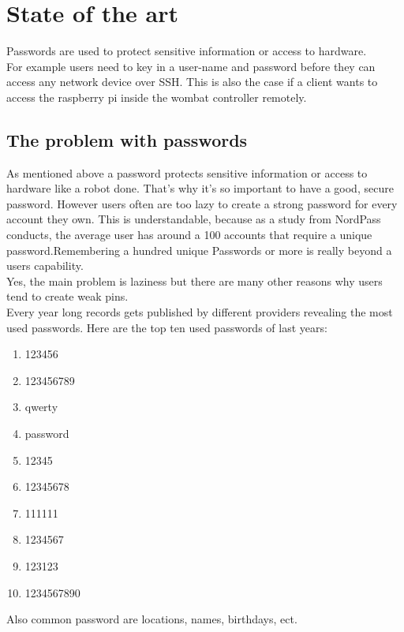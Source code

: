 \documentclass[conference]{IEEEtran}
\begin{document}
\section{State of the art}
Passwords are used to protect sensitive information or access to hardware.\\
 For example users need to key in a user-name and password before they can access any network device over SSH. This is also the case if a client wants to access the raspberry pi inside the wombat controller remotely. 

\subsection{The problem with passwords} \cite{b1} \cite{b2}
As mentioned above a password protects sensitive information or access to hardware like a robot done. That's why it's so important to have a good, secure password. However users often are too lazy to create a strong password for every account they own. This is understandable, because as a study from NordPass conducts, the average user has around a 100 accounts that require a unique password.Remembering a hundred unique Passwords or more is really beyond a users capability.\\
Yes, the main problem is laziness but there are many other reasons why users tend to create weak pins.\\
Every year long records gets published by different providers revealing the most used passwords. Here are the top ten used passwords of last years: \cite{b3}
\begin{enumerate}
\item 123456
\item 123456789
\item qwerty
\item password
\item 12345
\item 12345678
\item 111111
\item 1234567
\item 123123
\item 1234567890
\end{enumerate}
Also common password are locations, names, birthdays, ect.
\end{document}
